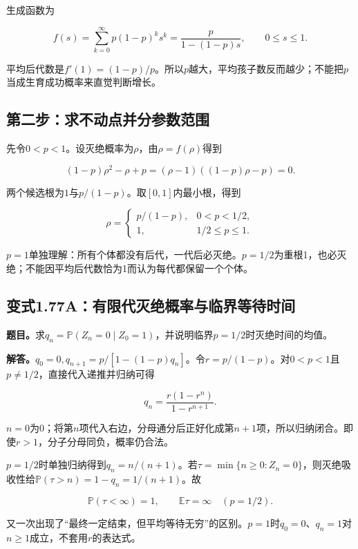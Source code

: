 \documentclass[
  11pt,a4paper,UTF8,fontset=fandol]{ctexart}
\begin{document}
生成函数为

\[f(s)=\sum_{k=0}^{\infty}p(1-p)^ks^k=\frac{p}{1-(1-p)s},\qquad0\le s\le1.\]

平均后代数是\(f'(1)=(1-p)/p\)。所以\(p\)越大，平均孩子数反而越少；不能把\(p\)当成生育成功概率来直觉判断增长。

\subsection{第二步：求不动点并分参数范围}\label{ux7b2cux4e8cux6b65ux6c42ux4e0dux52a8ux70b9ux5e76ux5206ux53c2ux6570ux8303ux56f4}

先令\(0<p<1\)。设灭绝概率为\(\rho\)，由\(\rho=f(\rho)\)得到

\[(1-p)\rho^2-\rho+p=(\rho-1)((1-p)\rho-p)=0.\]

两个候选根为\(1\)与\(p/(1-p)\)。取\([0,1]\)内最小根，得到

\[\boxed{\rho=
\begin{cases}
p/(1-p),&0<p<1/2,\\
1,&1/2\le p\le1.
\end{cases}}\]

\(p=1\)单独理解：所有个体都没有后代，一代后必灭绝。\(p=1/2\)为重根1，也必灭绝；不能因平均后代数恰为1而认为每代都保留一个个体。

\subsection{变式1.77A：有限代灭绝概率与临界等待时间}\label{ux53d8ux5f0f1.77aux6709ux9650ux4ee3ux706dux7eddux6982ux7387ux4e0eux4e34ux754cux7b49ux5f85ux65f6ux95f4}

\textbf{题目。}求\(q_n=\mathbb P(Z_n=0\mid Z_0=1)\)，并说明临界\(p=1/2\)时灭绝时间的均值。

\textbf{解答。}\(q_0=0,q_{n+1}=p/[1-(1-p)q_n]\)。令\(r=p/(1-p)\)。对\(0<p<1\)且\(p\ne1/2\)，直接代入递推并归纳可得

\[\boxed{q_n=\frac{r(1-r^n)}{1-r^{n+1}}.}\]

\(n=0\)为0；将第\(n\)项代入右边，分母通分后正好化成第\(n+1\)项，所以归纳闭合。即使\(r>1\)，分子分母同负，概率仍合法。

\(p=1/2\)时单独归纳得到\(q_n=n/(n+1)\)。若\(\tau=\min\{n\ge0:Z_n=0\}\)，则灭绝吸收性给\(\mathbb P(\tau>n)=1-q_n=1/(n+1)\)。故

\[\boxed{\mathbb P(\tau<\infty)=1,\qquad\mathbb E\tau=\infty\quad(p=1/2).}\]

又一次出现了``最终一定结束，但平均等待无穷''的区别。\(p=1\)时\(q_0=0\)、\(q_n=1\)对\(n\ge1\)成立，不套用\(r\)的表达式。
\end{document}

